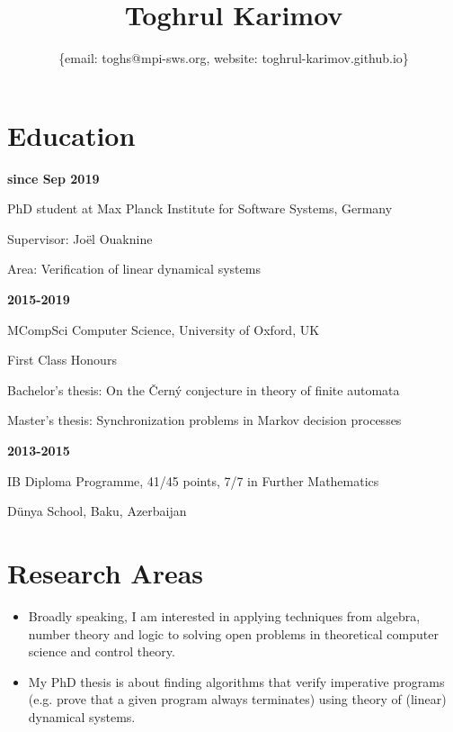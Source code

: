 \documentclass{article}
\title{\bfseries\Huge Toghrul Karimov}
\author{\{email: toghs@mpi-sws.org, website: toghrul-karimov.github.io\}}
\date{}
\begin{document}
	\maketitle
	\section*{Education}
		\begin{minipage}{0.3\textwidth}
			\hspace{0.5cm} \textbf{since Sep 2019}
		\end{minipage}
		\begin{minipage}{0.7\textwidth}
			PhD student at Max Planck Institute for Software Systems, Germany
			
			Supervisor: Jo\"el Ouaknine 
			
			Area: Verification of linear dynamical systems
		\end{minipage}
	
	\vspace{0.26cm}
	
	\noindent\begin{minipage}{0.3\textwidth}
		\hspace{0.5cm} \textbf{2015-2019}
	\end{minipage}
	\begin{minipage}{0.7\textwidth}
		MCompSci Computer Science, University of Oxford, UK
		
		First Class Honours
		
		Bachelor's thesis: On the Černý conjecture in theory of finite automata
		
		Master's thesis: Synchronization problems in Markov decision processes 
	\end{minipage}

	\vspace{0.27cm}
	
	\noindent\begin{minipage}{0.3\textwidth}
		\hspace{0.5cm} \textbf{2013-2015}
	\end{minipage}
	\begin{minipage}{0.7\textwidth}
		IB Diploma Programme, 41/45 points, 7/7 in Further Mathematics
		
		D\"unya School, Baku, Azerbaijan
	\end{minipage}

	\section*{Research Areas}
	\begin{itemize}
		\item Broadly speaking, I am interested in applying techniques from algebra, number theory and logic to solving open problems in theoretical computer science and control theory. 
		\item My PhD thesis is about finding algorithms that verify imperative programs (e.g. prove that a given program always terminates) using theory of (linear) dynamical systems.
	\end{itemize}
\end{document}
